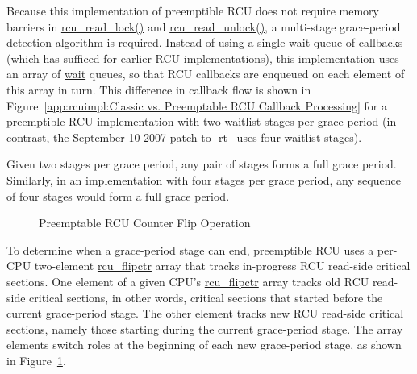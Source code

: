 Because this implementation of preemptible RCU does not require memory
barriers in \url{rcu_read_lock()} and \url{rcu_read_unlock()},
a multi-stage grace-period detection algorithm is required.
Instead of using a single \url{wait} queue of callbacks
(which has sufficed for earlier RCU implementations), this implementation
uses an array of \url{wait} queues, so that RCU callbacks
are enqueued on each element of this array in turn.
This difference in callback flow is shown in
Figure~\ref{app:rcuimpl:Classic vs. Preemptable RCU Callback Processing}
for a preemptible RCU implementation with two waitlist stages per grace period
(in contrast, 
the September 10 2007 patch to -rt~\cite{PaulEMcKenney2007PreemptibleRCUPatch}
uses four waitlist stages).

Given two stages per grace period, any pair of
stages forms a full grace period.
Similarly, in an implementation with four stages per grace period,
any sequence of four stages would form a full grace period.

\begin{figure}[htb]
\begin{center}
\end{center}
\caption{Preemptable RCU Counter Flip Operation}
\label{app:rcuimpl:Preemptable RCU Counter Flip Operation}
\end{figure}

To determine when a grace-period stage can end,
preemptible RCU uses a per-CPU two-element \url{rcu_flipctr} array
that tracks in-progress RCU read-side critical sections.
One element of a given CPU's \url{rcu_flipctr} array tracks
old RCU read-side critical sections, in other words, critical sections
that started before the current grace-period stage.
The other element tracks new RCU read-side critical
sections, namely those starting during the current grace-period stage.
The array elements switch roles at the beginning of each new grace-period
stage, as shown in
Figure~\ref{app:rcuimpl:Preemptable RCU Counter Flip Operation}.

